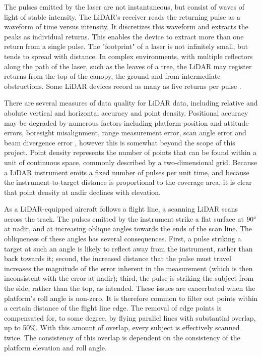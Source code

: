 \documentclass[10pt]{report}
\begin{document}
The pulses emitted by the laser are not instantaneous, but consist of waves of light of stable intensity. The LiDAR's receiver reads the returning pulse as a waveform of time versus intensity. It discretizes this waveform and extracts the peaks as individual returns. This enables the device to extract more than one return from a single pulse. The "footprint" of a laser is not infinitely small, but tends to spread with distance. In complex environments, with multiple reflectors along the path of the laser, such as the leaves of a tree, the LiDAR may register returns from the top of the canopy, the ground and from intermediate obstructions. Some LiDAR devices record as many as five returns per pulse \cite{Lillesand1999}.

There are several measures of data quality for LiDAR data, including relative and abolute vertical and horizontal accuracy and point density. Positional accuracy may be degraded by numerous factors including platform position and attitude errors, boresight misalignment, range measurement error, scan angle error and beam divergence error \cite{May2007}, however this is somewhat beyond the scope of this project. Point density represents the number of points that can be found within a unit of continuous space, commonly described by a two-dimensional grid. Because a LiDAR instrument emits a fixed number of pulses per unit time, and because the instrument-to-target distance is proportional to the coverage area, it is clear that point density at nadir declines with elevation. 

As a LiDAR-equipped aircraft follows a flight line, a scanning LiDAR scans across the track. The pulses emitted by the instrument strike a flat surface at $90\degree$ at nadir, and at increasing oblique angles towards the ends of the scan line. The obliqueness of these angles has several consequences. First, a pulse striking a target at such an angle is likely to reflect away from the instrument, rather than back towards it; second, the increased distance that the pulse must travel increases the magnitude of the error inherent in the measurement (which is then inconsistent with the error at nadir); third, the pulse is striking the subject from the side, rather than the top, as intended. These issues are exacerbated when the platform's roll angle is non-zero. It is therefore common to filter out points within a certain distance of the flight line edge. The removal of edge points is compensated for, to some degree, by flying parallel lines with substantial overlap, up to 50\%. With this amount of overlap, every subject is effectively scanned twice. The consistency of this overlap is dependent on the consistency of the platform elevation and roll angle.
\end{document}
